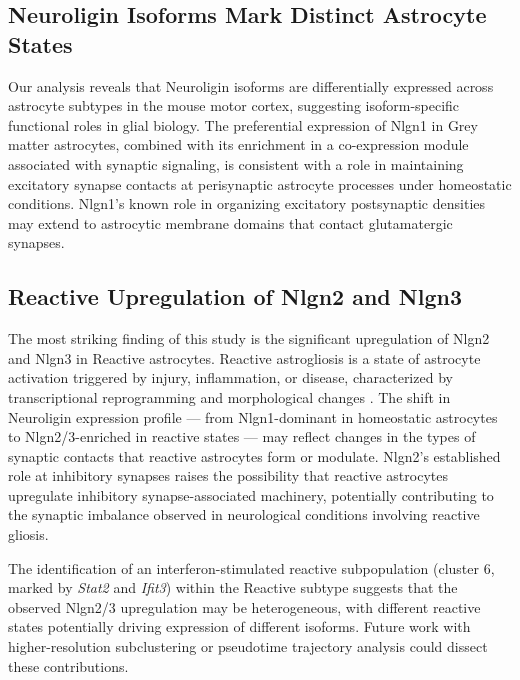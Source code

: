 \documentclass[sigconf]{acmart}
\begin{document}
\subsection{Neuroligin Isoforms Mark Distinct Astrocyte States}
Our analysis reveals that Neuroligin isoforms are differentially expressed across astrocyte subtypes in the mouse motor cortex, suggesting isoform-specific functional roles in glial biology. The preferential expression of Nlgn1 in Grey matter astrocytes, combined with its enrichment in a co-expression module associated with synaptic signaling, is consistent with a role in maintaining excitatory synapse contacts at perisynaptic astrocyte processes under homeostatic conditions. Nlgn1's known role in organizing excitatory postsynaptic densities \cite{sudhof2008neuroligin} may extend to astrocytic membrane domains that contact glutamatergic synapses.

\subsection{Reactive Upregulation of Nlgn2 and Nlgn3}
The most striking finding of this study is the significant upregulation of Nlgn2 and Nlgn3 in Reactive astrocytes. Reactive astrogliosis is a state of astrocyte activation triggered by injury, inflammation, or disease, characterized by transcriptional reprogramming and morphological changes \cite{liddelow2017neurotoxic}. The shift in Neuroligin expression profile --- from Nlgn1-dominant in homeostatic astrocytes to Nlgn2/3-enriched in reactive states --- may reflect changes in the types of synaptic contacts that reactive astrocytes form or modulate. Nlgn2's established role at inhibitory synapses \cite{varoqueaux2006neuroligins} raises the possibility that reactive astrocytes upregulate inhibitory synapse-associated machinery, potentially contributing to the synaptic imbalance observed in neurological conditions involving reactive gliosis.

The identification of an interferon-stimulated reactive subpopulation (cluster 6, marked by \textit{Stat2} and \textit{Ifit3}) within the Reactive subtype suggests that the observed Nlgn2/3 upregulation may be heterogeneous, with different reactive states potentially driving expression of different isoforms. Future work with higher-resolution subclustering or pseudotime trajectory analysis could dissect these contributions.
\end{document}
